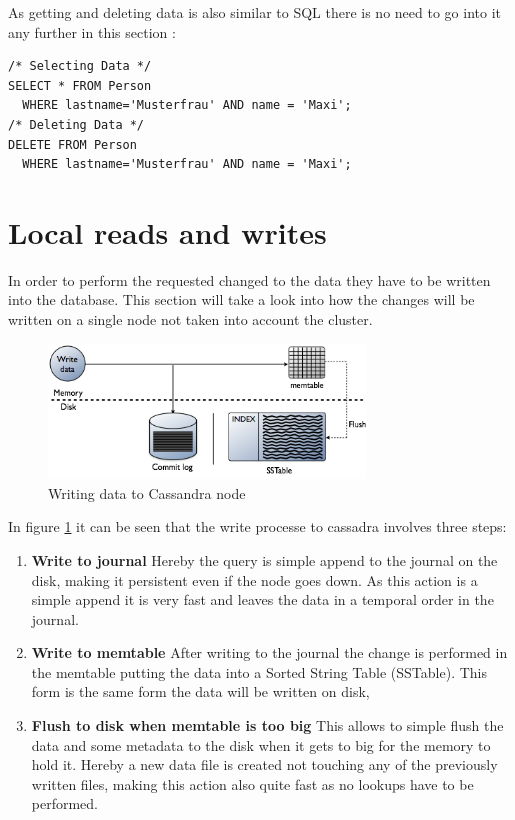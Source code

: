 As getting and deleting data is also similar to SQL there is no need to go into it any further in this section \autocite{cqlAlexMeng, cassandra3cqldocSelect}:
\begin{verbatim}
/* Selecting Data */
SELECT * FROM Person
  WHERE lastname='Musterfrau' AND name = 'Maxi';
/* Deleting Data */
DELETE FROM Person
  WHERE lastname='Musterfrau' AND name = 'Maxi';
\end{verbatim}

\section{Local reads and writes}
In order to perform the requested changed to the data they have to be written into the database. This section will take a look into how the changes will be written on a single node not taken into account the cluster.

\begin{figure}[ht]
    \centering
    \includegraphics[width=0.75\textwidth]{img/cassandra_local_write.png}
    \caption{Writing data to Cassandra node \autocite{datastaxWriteData}}
    \label{fig:cassandra:writeData}
\end{figure}
In figure \ref{fig:cassandra:writeData} it can be seen that the write processe to cassadra involves three steps:
\begin{enumerate}
\item \textbf{Write to journal} Hereby the query is simple append to the journal on the disk, making it persistent even if the node goes down. As this action is a simple append it is very fast and leaves the data in a temporal order in the journal.
\item \textbf{Write to memtable} After writing to the journal the change is performed in the memtable putting the data into a Sorted String Table (SSTable). This form is the same form the data will be written on disk,
\item \textbf{Flush to disk when memtable is too big} This allows to simple flush the data and some metadata to the disk when it gets to big for the memory to hold it. Hereby a new data file is created not touching any of the previously written files, making this action also quite fast as no lookups have to be performed.
\end{enumerate}

